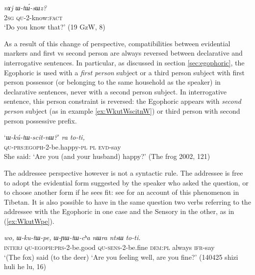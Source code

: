 \documentclass[oldfontcommands,oneside,a4paper,11pt]{article}
\newcommand{\ipa}[1]{{\phon\textit{#1}}} %
\newcommand{\refb}[1]{(\ref{#1})}
\begin{document}
\begin{exe}
\ex \label{ex:WtWsWz}
\gll 
\ipa{nɤj}	\ipa{ɯ-tɯ́-sɯz?} \\
\textsc{2sg} \textsc{qu}-2-know:\textsc{fact} \\
\glt `Do you know that?' (19 GzW, 8)
\end{exe}

As a result of this change of perspective, compatibilities between evidential markers and first vs second person are always reversed between declarative and interrogative sentences. In particular, as discussed in section \ref{sec:egophoric}, the Egophoric is used with a \textit{first person} subject or a third person subject with first person possessor (or belonging to the same household as the speaker) in declarative sentences, never with a second person subject. In interrogative sentence, this person constraint is reversed: the Egophoric appears with \textit{second person} subject (as in example \ref{ex:WkutWscitnW}) or third person with second person possessive prefix. 


\begin{exe}
\ex \label{ex:WkutWscitnW}
\gll	`\ipa{ɯ-kú-tɯ-scit-nɯ?}' 	\ipa{ra} 	\ipa{to-ti,} \\
  \textsc{qu-prs:egoph}-2-be.happy-\textsc{pl} \textsc{pl} \textsc{evd}-say \\
\glt She said: `Are you (and your husband) happy?' (The frog 2002, 121)
\end{exe}



The addressee perspective however is not a syntactic rule. The addressee is free to adopt the evidential form suggested by the speaker who asked the question, or to choose another form if he sees fit: see \citealt{garrett07symbiosis} for an account of this phenomenon in Tibetan. It is also possible to have in the same question two verbs referring to the addressee with the Egophoric in one case and the Sensory in the other, as in \refb{ex:WkutWpe}. 

\begin{exe}
\ex \label{ex:WkutWpe}
\gll 
\ipa{wo,} 	\ipa{ɯ-ku-tɯ-pe,} 	\ipa{ɯ-ɲɯ-tɯ-cʰa} 	\ipa{nɯra} 	\ipa{ntsɯ} 	\ipa{to-ti.} \\
\textsc{interj} \textsc{qu-egoph:prs}-2-be.good \textsc{qu-sens}-2-be.fine \textsc{dem:pl} always \textsc{ifr}-say  \\
\glt `(The fox) said (to the deer) `Are you feeling well, are you fine?' (140425 shizi huli he lu, 16)
\end{exe}
\end{document}
